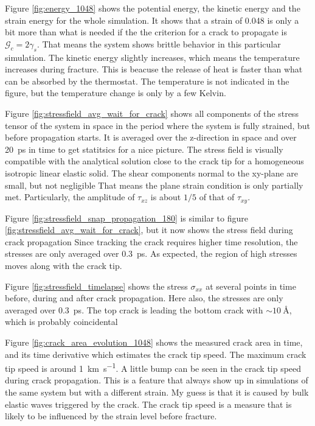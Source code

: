 Figure \ref{fig:energy_1048} shows the potential energy, the kinetic energy and the strain energy for the whole simulation. It shows that a strain of 0.048 is only a bit more than what is needed if the the criterion for a crack to propagate is $\mathcal{G}_c = 2\gamma_s$. That means the system shows brittle behavior in this particular simulation. The kinetic energy slightly increases, which means the temperature increases during fracture. This is beacuse the release of heat is faster than what can be absorbed by the thermostat. The temperature is not indicated in the figure, but the temperature change is only by a few Kelvin. 

Figure \ref{fig:stressfield_avg_wait_for_crack} shows all components of the stress tensor of the system in space in the period where the system is fully strained, but before propagation starts. It is averaged over the z-direction in space and over \SI{20}{\pico\second} in time to get statitsics for a nice picture. The stress field is visually compatible with the analytical solution close to the crack tip for a homogeneous isotropic linear elastic solid. The shear components normal to the xy-plane are small, but not negligible That means the plane strain condition is only partially met. Particularly, the amplitude of $\tau_{xz}$ is about $1/5$ of that of $\tau_{xy}$. 


Figure \ref{fig:stressfield_snap_propagation_180} is similar to figure \ref{fig:stressfield_avg_wait_for_crack}, but it now shows the stress field during crack propagation Since tracking the crack requires higher time resolution, the stresses are only averaged over \SI{0.3}{\pico\second}. As expected, the region of high stresses moves along with the crack tip.

Figure \ref{fig:stressfield_timelapse} shows the stress $\sigma_{xx}$ at several points in time before, during and after crack propagation. Here also, the stresses are only averaged over \SI{0.3}{\pico\second}. The top crack is leading the bottom crack with $\sim \SI{10}{\angstrom}$, which is probably coincidental

Figure \ref{fig:crack_area_evolution_1048} shows the measured crack area in time, and its time derivative which estimates the crack tip speed. The maximum crack tip speed is around \SI{1}{\kilo\meter\per\second}. A little bump can be seen in the crack tip speed during crack propagation. This is a feature that always show up in simulations of the same system but with a different strain. My guess is that it is caused by bulk elastic waves triggered by the crack. The crack tip speed is a measure that is likely to be influenced by the strain level before fracture. 

